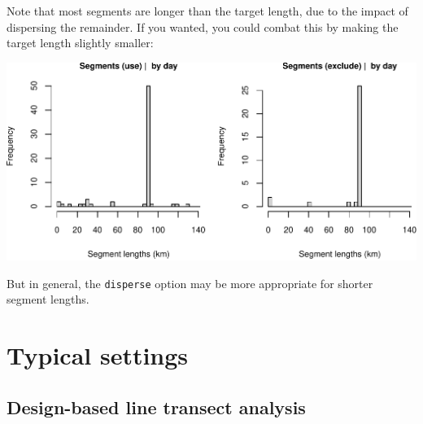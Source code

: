 \documentclass[
]{book}
\newenvironment{Shaded}{\begin{snugshade}}{\end{snugshade}}
\newcommand{\CommentTok}[1]{\textcolor[rgb]{0.56,0.35,0.01}{\textit{#1}}}
\newcommand{\DataTypeTok}[1]{\textcolor[rgb]{0.13,0.29,0.53}{#1}}
\newcommand{\DecValTok}[1]{\textcolor[rgb]{0.00,0.00,0.81}{#1}}
\newcommand{\KeywordTok}[1]{\textcolor[rgb]{0.13,0.29,0.53}{\textbf{#1}}}
\newcommand{\NormalTok}[1]{#1}
\newcommand{\OperatorTok}[1]{\textcolor[rgb]{0.81,0.36,0.00}{\textbf{#1}}}
\newcommand{\OtherTok}[1]{\textcolor[rgb]{0.56,0.35,0.01}{#1}}
\newcommand{\StringTok}[1]{\textcolor[rgb]{0.31,0.60,0.02}{#1}}
\begin{document}
Note that most segments are longer than the target length, due to the impact of dispersing the remainder. If you wanted, you could combat this by making the target length slightly smaller:

\begin{Shaded}
\end{Shaded}

\includegraphics{figures/unnamed-chunk-146-1.pdf}

But in general, the \texttt{disperse} option may be more appropriate for shorter segment lengths.

\hypertarget{typical-settings}{%
\section*{Typical settings}\label{typical-settings}}

\hypertarget{design-based-line-transect-analysis}{%
\subsection*{Design-based line transect analysis}\label{design-based-line-transect-analysis}}
\end{document}
